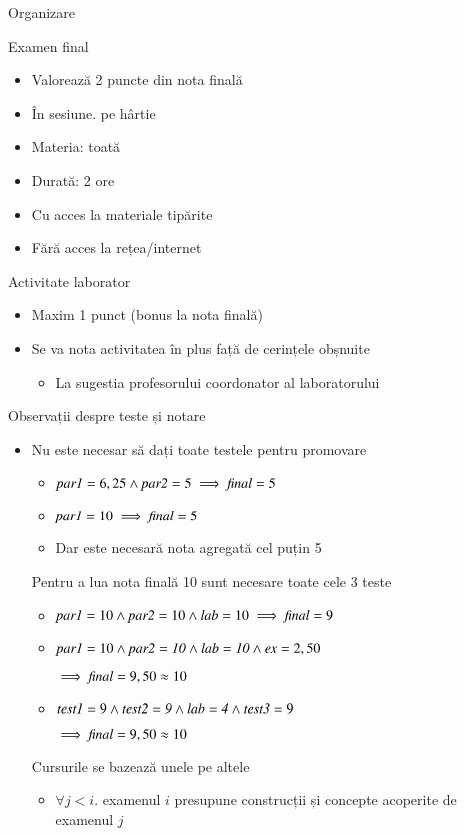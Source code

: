 \documentclass[xcolor=pdftex,romanian,colorlinks]{beamer}
\begin{document}
\begin{section}{Organizare}
\begin{frame}{Examen final}
\begin{itemize}
\item Valorează 2 puncte din nota finală
\item În sesiune. pe hârtie
\item Materia: toată
\item Durată: 2 ore
\item Cu acces la materiale tipărite
\item Fără acces la rețea/internet
\end{itemize}
\end{frame}

\begin{frame}{Activitate laborator}
\begin{itemize}
\item Maxim 1 punct (bonus la nota finală)
\item Se va nota activitatea în plus față de cerințele obșnuite
\begin{itemize}
\item La sugestia profesorului coordonator al laboratorului
\end{itemize}
\end{itemize}
\end{frame}

\begin{frame}{Observații despre teste și notare}
\begin{itemize}
\item Nu este necesar să dați toate testele pentru promovare
\begin{itemize}
\item ${\it par1} = 6,25 \wedge {\it par2} =  5 \implies {\it final} = 5$
\item ${\it par1} = 10 \implies {\it final} = 5$
\item Dar este necesară nota agregată cel puțin 5
\end{itemize}
\vitem Pentru a lua nota finală 10 sunt necesare toate cele 3 teste
\begin{itemize}
\item ${\it par1} = 10 \wedge {\it par2} =  10 \wedge {\it lab} =  10 \implies {\it final} = 9$
\item ${\it par1} = 10 \wedge {\it par2 =  10} \wedge {\it lab =  10} \wedge {\it ex} = 2,50$

\hfill $ \implies {\it final} = 9,50\approx 10$
\item ${\it test1} = 9 \wedge {\it test2 =  9} \wedge {\it lab =  4} \wedge {\it test3} = 9$

\hfill $ \implies {\it final} = 9,50\approx 10$
\end{itemize}
\vitem Cursurile se bazează unele pe altele
\begin{itemize}
\item $\forall j < i . $ examenul $i$ presupune construcții și concepte acoperite de examenul $j$
\end{itemize}
\end{itemize}
\end{frame}


\end{section}
\end{document}
